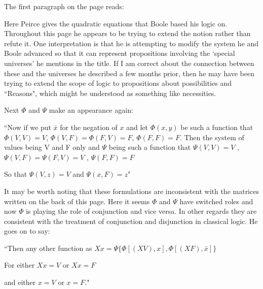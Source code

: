 \documentclass[12pt]{article}
\begin{document}
The first paragraph on the page reads:
\begin{singlespace}
\end{singlespace}
\noindent Here Peirce gives the quadratic equations that Boole based his logic on. Throughout this page he appears to be trying to extend the notion rather than refute it. One interpretation is that he is attempting to modify the system he and Boole advanced so that it can represent propositions involving the `special universes' he mentions in the title. If I am correct about the connection between these and the universes he described a few months prior, then he may have been trying to extend the scope of logic to propositions about possibilities and ``Reasons", which might be understood as something like necessities.

Next $\Phi$ and $\Psi$ make an appearance again:
\begin{singlespace}
``Now if we put $\bar{x}$ for the negation of $x$ and let $\Phi(x,y)$ be such a function that $\Phi(V,V)=V$, $\Phi(V,F)=\Phi(F,V)=F$, $\Phi(F,F)=F$. Then the system of values being V and F only and $\Psi$ being such a function that $\Psi(V, V)= V$ , $\Psi(V, F)=\Psi(F, V)=V$ , $\Psi(F, F)=F$

So that $\Psi(V, z)=V$ and $\Psi(x, F)= z$"
\end{singlespace}
\noindent It may be worth noting that these formulations are inconsistent with the matrices written on the back of this page. Here it seems $\Phi$ and $\Psi$ have switched roles and now $\Phi$ is playing the role of conjunction and vice versa. In other regards they are consistent with the treatment of conjunction and disjunction in classical logic. He goes on to say:
\begin{singlespace}
``Then any other function as $Xx=\Psi\{\Phi[(XV), x], \Phi[(XF),\bar{x}]\}$

For either $Xx=V$ or $Xx=F$

and either $x=V$ or $x=F$."
\end{singlespace}
\end{document}
